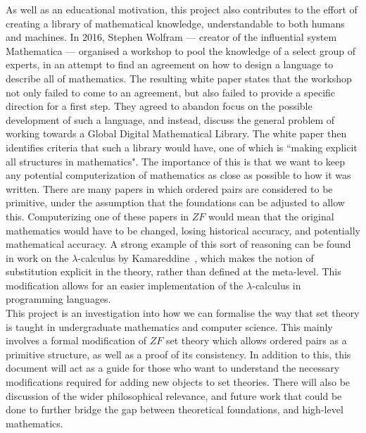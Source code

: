 \documentclass[11pt]{report}
\theoremstyle{definition}
\theoremstyle{theorem}
\theoremstyle{lemma}
\begin{document}
As well as an educational motivation, this project also contributes to the effort of creating a library of mathematical knowledge, understandable to both humans and machines.
In 2016, Stephen Wolfram --- creator of the influential system Mathematica --- organised a workshop to pool the knowledge of a select group of experts, in an attempt to find an agreement on how to design a language to describe all of mathematics. 
The resulting white paper states that the workshop not only failed to come to an agreement, but also failed to provide a specific direction for a first step. 
They agreed to abandon focus on the possible development of such a language, and instead, discuss the general problem of working towards a Global Digital Mathematical Library. 
The white paper then identifies criteria that such a library would have, one of which is ``making explicit all structures in mathematics". 
The importance of this is that we want to keep any potential computerization of mathematics as close as possible to how it was written. 
There are many papers in which ordered pairs are considered to be primitive, under the assumption that the foundations can be adjusted to allow this. 
Computerizing one of these papers in $\mathit{ZF}$ would mean that the original mathematics would have to be changed, losing historical accuracy, and potentially mathematical accuracy. 
A strong example of this sort of reasoning can be found in work on the $\lambda$-calculus by Kamareddine~\cite{fairouz}, which makes the notion of substitution explicit in the theory, rather than defined at the meta-level.
This modification allows for an easier implementation of the $\lambda$-calculus in programming languages.\\

This project is an investigation into how we can formalise the way that set theory is taught in undergraduate mathematics and computer science.
This mainly involves a formal modification of $\mathit{ZF}$ set theory which allows ordered pairs as a primitive structure, as well as a proof of its consistency.
In addition to this, this document will act as a guide for those who want to understand the necessary modifications required for adding new objects to set theories. 
There will also be discussion of the wider philosophical relevance, and future work that could be done to further bridge the gap between theoretical foundations, and high-level mathematics. 
\end{document}
